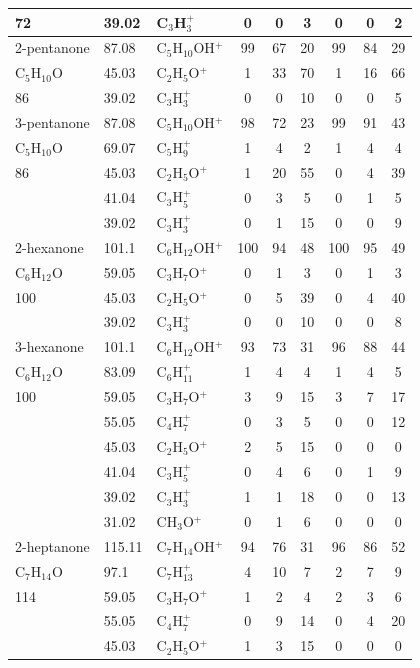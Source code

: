 {\begin{longtable}[c]{lllcccccc}
72 & 39.02 & C$_3$H$_{3}^+$ & 0 & 0 & 3 & 0 & 0 & 2 \\ \hline
2-pentanone & 87.08 & C$_5$H$_{10}$OH$^+$ & 99 & 67 & 20 & 99 & 84 & 29 \\
C$_5$H$_{10}$O & 45.03 & C$_2$H$_{5}$O$^+$ & 1 & 33 & 70 & 1 & 16 & 66 \\
86 & 39.02 & C$_3$H$_{3}^+$ & 0 & 0 & 10 & 0 & 0 & 5 \\ \hline
3-pentanone & 87.08 & C$_5$H$_{10}$OH$^+$ & 98 & 72 & 23 & 99 & 91 & 43 \\
C$_5$H$_{10}$O & 69.07 & C$_5$H$_{9}^+$ & 1 & 4 & 2 & 1 & 4 & 4 \\
86 & 45.03 & C$_2$H$_{5}$O$^+$ & 1 & 20 & 55 & 0 & 4 & 39 \\
 & 41.04 & C$_3$H$_{5}^+$ & 0 & 3 & 5 & 0 & 1 & 5 \\
 & 39.02 & C$_3$H$_{3}^+$ & 0 & 1 & 15 & 0 & 0 & 9 \\ \hline
2-hexanone & 101.1 & C$_6$H$_{12}$OH$^+$ & 100 & 94 & 48 & 100 & 95 & 49 \\
C$_6$H$_{12}$O & 59.05 & C$_3$H$_{7}$O$^+$ & 0 & 1 & 3 & 0 & 1 & 3 \\
100 & 45.03 & C$_2$H$_{5}$O$^+$ & 0 & 5 & 39 & 0 & 4 & 40 \\
 & 39.02 & C$_3$H$_{3}^+$ & 0 & 0 & 10 & 0 & 0 & 8 \\ \hline
3-hexanone & 101.1 & C$_6$H$_{12}$OH$^+$ & 93 & 73 & 31 & 96 & 88 & 44 \\
C$_6$H$_{12}$O & 83.09 & C$_6$H$_{11}^+$ & 1 & 4 & 4 & 1 & 4 & 5 \\
100 & 59.05 & C$_3$H$_{7}$O$^+$ & 3 & 9 & 15 & 3 & 7 & 17 \\
 & 55.05 & C$_4$H$_{7}^+$ & 0 & 3 & 5 & 0 & 0 & 12 \\
 & 45.03 & C$_2$H$_{5}$O$^+$ & 2 & 5 & 15 & 0 & 0 & 0 \\
 & 41.04 & C$_3$H$_{5}^+$ & 0 & 4 & 6 & 0 & 1 & 9 \\
 & 39.02 & C$_3$H$_{3}^+$ & 1 & 1 & 18 & 0 & 0 & 13 \\
 & 31.02 & CH$_{3}$O$^+$ & 0 & 1 & 6 & 0 & 0 & 0 \\ \hline
2-heptanone & 115.11 & C$_7$H$_{14}$OH$^+$ & 94 & 76 & 31 & 96 & 86 & 52 \\
C$_7$H$_{14}$O & 97.1 & C$_7$H$_{13}^+$ & 4 & 10 & 7 & 2 & 7 & 9 \\
114 & 59.05 & C$_3$H$_{7}$O$^+$ & 1 & 2 & 4 & 2 & 3 & 6 \\
 & 55.05 & C$_4$H$_{7}^+$ & 0 & 9 & 14 & 0 & 4 & 20 \\
 & 45.03 & C$_2$H$_{5}$O$^+$ & 1 & 3 & 15 & 0 & 0 & 0 \\

\end{longtable}}
